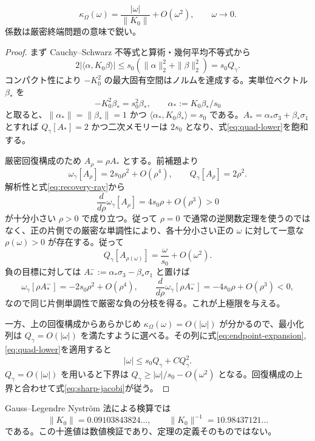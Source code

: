 \begin{theorem}
\label{thm:jacobi-sharp}
\begin{equation}
\boxed{\kappa_\Omega(\omega)=\frac{|\omega|}{\|K_0\|}+O(\omega^2),\qquad \omega\to0.}
\label{eq:sharp-jacobi}
\end{equation}
係数は厳密終端問題の意味で鋭い。
\end{theorem}
\begin{proof}
まず Cauchy--Schwarz 不等式と算術・幾何平均不等式から
\begin{equation}
2|\langle\alpha,K_0\beta\rangle|
\le s_0(\|\alpha\|_2^2+\|\beta\|_2^2)=s_0 Q_\gamma.
\label{eq:quad-lower}
\end{equation}
コンパクト性により $-K_0^2$ の最大固有空間はノルムを達成する。実単位ベクトル $\beta_*$ を
\[
-K_0^2\beta_*=s_0^2\beta_*,\qquad
\alpha_*:=K_0\beta_*/s_0
\]
と取ると、$\|\alpha_*\|=\|\beta_*\|=1$ かつ $\langle\alpha_*,K_0\beta_*\rangle=s_0$ である。$A_*=\alpha_*\sigma_3+\beta_*\sigma_1$ とすれば $Q_\gamma[A_*]=2$ かつ二次メモリーは $2s_0$ となり、式\eqref{eq:quad-lower}を飽和する。

厳密回復構成のため $A_\rho=\rho A_*$ とする。前補題より
\begin{equation}
\omega_\gamma[A_\rho]=2s_0 \rho^2+O(\rho^4),\qquad Q_\gamma[A_\rho]=2\rho^2.
\label{eq:recovery-ray}
\end{equation}
解析性と式\eqref{eq:recovery-ray}から
\[
\frac{d}{d\rho}\omega_\gamma[A_\rho]
=4s_0\rho+O(\rho^3)>0
\]
が十分小さい $\rho>0$ で成り立つ。従って $\rho=0$ で通常の逆関数定理を使うのではなく、正の片側での厳密な単調性により、各十分小さい正の $\omega$ に対して一意な $\rho(\omega)>0$ が存在する。従って
\[
Q_\gamma[A_{\rho(\omega)}]=\frac{\omega}{s_0}+O(\omega^2).
\]
負の目標に対しては $A_*^-:=\alpha_*\sigma_3-\beta_*\sigma_1$ と置けば
\[
\omega_\gamma[\rho A_*^-]=-2s_0 \rho^2+O(\rho^4),\qquad
\frac{d}{d\rho}\omega_\gamma[\rho A_*^-]=-4s_0\rho+O(\rho^3)<0,
\]
なので同じ片側単調性で厳密な負の分枝を得る。これが上極限を与える。

一方、上の回復構成からあらかじめ $\kappa_\Omega(\omega)=O(|\omega|)$ が分かるので、最小化列は $Q_\gamma=O(|\omega|)$ を満たすように選べる。その列に式\eqref{eq:endpoint-expansion},\eqref{eq:quad-lower}を適用すると
\[
|\omega|\le s_0 Q_\gamma+C Q_\gamma^2.
\]
$Q_\gamma=O(|\omega|)$ を用いると下界は $Q_\gamma\ge |\omega|/s_0-O(\omega^2)$ となる。回復構成の上界と合わせて式\eqref{eq:sharp-jacobi}が従う。
\end{proof}

Gauss--Legendre Nystr\"om 法による検算では
\begin{equation}
\|K_0\|=0.09103843824\ldots,\qquad \|K_0\|^{-1}=10.98437121\ldots
\label{eq:numeric-k0}
\end{equation}
である。この十進値は数値検証であり、定理の定義そのものではない。
